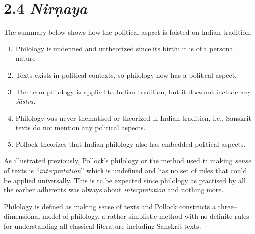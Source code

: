 \vspace{-.3cm}

\section*{2.4 {\it {\bfseries Nirṇaya}}}

\vspace{-.2cm}

The summary below shows how the political aspect is foisted on Indian tradition.

\begin{enumerate}
\itemsep=0pt
\item Philology is undefined and untheorized since its birth: it is of a personal nature

 \item Texts exists in political contexts, so philology now has a political aspect.

 \item The term philology is applied to Indian tradition, but it does not include any\textit{ śāstra}.

 \item Philology was never thematised or theorized in Indian tradition, i.e., Sanskrit texts do not mention any political aspects.

 \item Pollock theorizes that Indian philology also has embedded political aspects.

\end{enumerate}

As illustrated previously, Pollock’s philology or the method used in making \textit{sense} of texts is “\textit{interpretation}” which is undefined and has no set of rules that could be applied universally. This is to be expected since philology as practised by all the earlier adherents was always about \textit{interpretation} and nothing more.

Philology is defined as making sense of texts and Pollock constructs a three–dimensional model of philology, a rather simplistic method with no definite rules for understanding all classical literature including Sanskrit texts.

